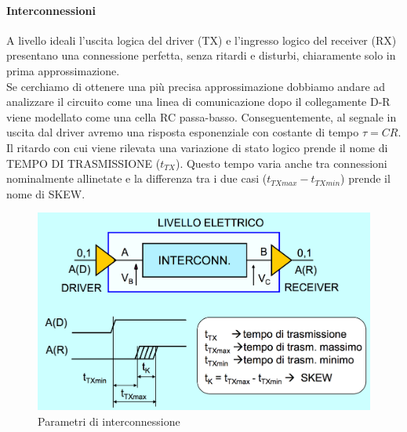 \documentclass[12pt]{article}
\begin{document}
\paragraph{Interconnessioni} A livello ideali l'uscita logica del driver (TX) e l'ingresso logico del receiver (RX) presentano una connessione perfetta, senza ritardi e disturbi, chiaramente solo in prima approssimazione.\\
Se cerchiamo di ottenere una più precisa approssimazione dobbiamo andare ad analizzare il circuito come una linea di comunicazione dopo il collegamente D-R viene modellato come una cella RC passa-basso. Conseguentemente, al segnale in uscita dal driver avremo una risposta esponenziale con costante di tempo $\tau = CR$. Il ritardo con cui viene rilevata una variazione di stato logico prende il nome di TEMPO DI TRASMISSIONE ($t_{TX}$). Questo tempo varia anche tra connessioni nominalmente allinetate e la differenza tra i due casi ($t_{TXmax}-t_{TXmin}$) prende il nome di SKEW.

\begin{figure}[!hp]
  \includegraphics[width=\textwidth]{images/interc.png}
  \caption{Parametri di interconnessione}
  \label{fig:interc}
\end{figure}

\end{document}
